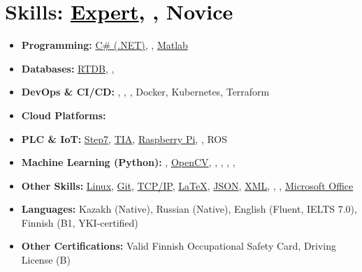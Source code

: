 \documentclass[a4paper,10pt]{article}
\begin{document}
\section*{Skills: \small\textcolor{black}{\uline{Expert}, , Novice}}
\begin{itemize}
    \item \textbf{Programming:} 
      \uline{C\# (.NET)}, 
      , 
      \uline{Matlab}
    \item \textbf{Databases:} 
      \uline{RTDB},
      , 
    \item \textbf{DevOps \& CI/CD:} 
      , 
      , 
      , 
      Docker, 
      Kubernetes, 
      Terraform
    \item \textbf{Cloud Platforms:} 
    \item \textbf{PLC \& IoT:} 
      \uline{Step7}, 
      \uline{TIA}, 
      \uline{Raspberry Pi}, 
      ,
      ROS
    \item \textbf{Machine Learning (Python):} 
      , 
      \uline{OpenCV}, 
      , 
      , 
      , 
      , 
    \item \textbf{Other Skills:} 
      \uline{Linux}, 
      \uline{Git}, 
      \uline{TCP/IP}, 
      \uline{LaTeX}, 
      \uline{JSON}, 
      \uline{XML}, 
      ,
      ,
      \uline{Microsoft Office}
    \item \textbf{Languages:} Kazakh (Native), Russian (Native), English (Fluent, IELTS 7.0), Finnish (B1, YKI-certified)
    \item \textbf{Other Certifications:} Valid Finnish Occupational Safety Card, Driving License (B)
\end{itemize}
\end{document}
